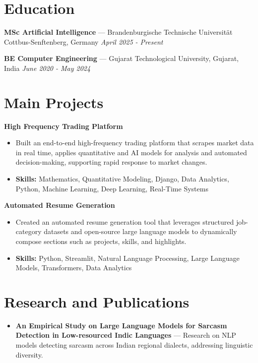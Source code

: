 \documentclass[a4paper,10pt]{article}
\begin{document}
\section*{Education}
\textbf{MSc Artificial Intelligence} — Brandenburgische Technische Universität Cottbus-Senftenberg, Germany \hfill \textit{April 2025 - Present}\par
\vspace{1.5pt}
\textbf{BE Computer Engineering} — Gujarat Technological University, Gujarat, India \hfill \textit{June 2020 - May 2024}\par

\section*{Main Projects}
\textbf{High Frequency Trading Platform}\par
\vspace{1pt}
\begin{itemize}
  \item Built an end-to-end high-frequency trading platform that scrapes market data in real time, applies quantitative and AI models for analysis and automated decision-making, supporting rapid response to market changes.
  \item \textbf{Skills:} Mathematics, Quantitative Modeling, Django, Data Analytics, Python, Machine Learning, Deep Learning, Real-Time Systems
\end{itemize}
\vspace{3pt}
\textbf{Automated Resume Generation}\par
\vspace{1pt}
\begin{itemize}
  \item Created an automated resume generation tool that leverages structured job-category datasets and open-source large language models to dynamically compose sections such as projects, skills, and highlights.
  \item \textbf{Skills:} Python, Streamlit, Natural Language Processing, Large Language Models, Transformers, Data Analytics
\end{itemize}

\section*{Research and Publications}
\begin{itemize}
\item \textbf{An Empirical Study on Large Language Models for Sarcasm Detection in Low-resourced Indic Languages} — Research on NLP models detecting sarcasm across Indian regional dialects, addressing linguistic diversity.
\end{itemize}
\end{document}
